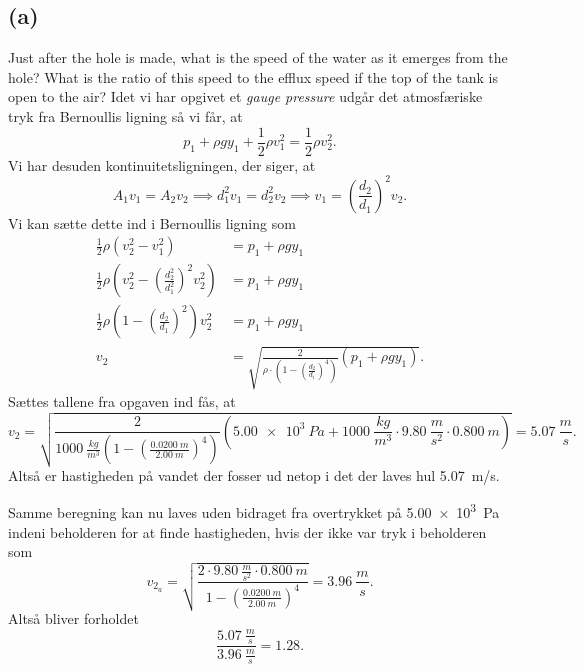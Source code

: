 \documentclass[12pt]{article}
\theoremstyle{definition}
\begin{document}
\subsection*{(a)}
Just after the hole is made, what is the speed of the water as it emerges from the hole? What is the ratio of this speed to the efflux speed if the top of the tank is open to the air?
\bigbreak
Idet vi har opgivet et \textit{gauge pressure} udgår det atmosfæriske tryk fra Bernoullis ligning så vi får, at
\[ 
p_1 + \rho g y_1 + \frac{1}{2}\rho v_1^2 = \frac{1}{2}\rho v_2^2
.\]
Vi har desuden kontinuitetsligningen, der siger, at
\[ 
  A_1 v_1 = A_2 v_2 \implies d_1^2 v_1 = d_2^2 v_2 \implies v_1 = \left( \frac{d_2}{d_1} \right)^2 v_2
.\]
Vi kan sætte dette ind i Bernoullis ligning som
\begin{align*}
  \frac{1}{2}\rho \left( v_2^2 - v_1^2 \right) &= p_1 + \rho g y_1 \\
  \frac{1}{2}\rho \left( v_2^2 - \left( \frac{d_2^2}{d_1^2} \right)^2 v_2^2 \right) &= p_1 + \rho g y_1  \\
  \frac{1}{2}\rho \left( 1 - \left( \frac{d_2}{d_1} \right)^2 \right) v_2^2 &= p_1 + \rho g y_1 \\
  v_2 &= \sqrt{\frac{2}{\rho \cdot \left( 1 - \left( \frac{d_2}{d_1} \right)^{4} \right)} (p_1 + \rho g y_1) }
.\end{align*}
Sættes tallene fra opgaven ind fås, at
\[ 
v_2 = \sqrt{\frac{2}{\qty{1000}{\frac{kg}{m^3}}  \left( 1 - \left( \frac{\qty{0,0200}{m}}{\qty{2,00}{m}} \right)^{4} \right)} (\qty{5,00e3}{Pa} + \qty{1000}{\frac{kg}{m^3}} \cdot \qty{9,80}{\frac{m}{s^2}} \cdot \qty{0,800}{m})} = \qty{5,07}{\frac{m}{s}} 
.\]
Altså er hastigheden på vandet der fosser ud netop i det der laves hul \qty{5,07}{m/s}.  

Samme beregning kan nu laves uden bidraget fra overtrykket på \qty{5,00e3}{Pa} indeni beholderen for at finde hastigheden, hvis der ikke var tryk i beholderen som
\[ 
  v_{2_a} = \sqrt{\frac{2 \cdot \qty{9,80}{\frac{m}{s^2}} \cdot \qty{0,800}{m} }{ 1 - \left( \frac{\qty{0,0200}{m} }{\qty{2,00}{m} } \right)^{4} }} = \qty{3,96}{\frac{m}{s}} 
.\]
Altså bliver forholdet
\[ 
\frac{\qty{5,07}{\frac{m}{s}}}{\qty{3,96}{\frac{m}{s}}} = \num{1,28} 
.\]
\end{document}
